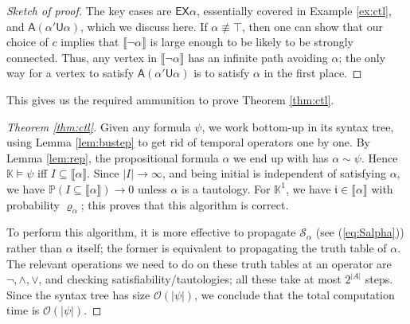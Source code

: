 \documentclass[runngingheads]{llncs}
\newcommand{\ini}{\mathfrak{i}}
\newcommand{\sem}[1]{\llbracket #1 \rrbracket}
\begin{document}
\begin{proof}[Sketch of proof]
The key cases are $\mathsf{EX}\alpha$, essentially covered in Example \ref{ex:ctl}, and $\mathsf{A}(\alpha'\mathsf{U}\alpha)$, which we discuss here. If $\alpha \not \equiv \top$, then one can show that our choice of $c$ implies that $\llbracket \neg \alpha \rrbracket$ is large enough to be likely to be strongly connected. Thus, any vertex in $\llbracket \neg \alpha \rrbracket$ has an infinite path avoiding $\alpha$; the only way for a vertex to satisfy $\mathsf{A}(\alpha'\mathsf{U}\alpha)$ is to satisfy $\alpha$ in the first place.
\end{proof}

This gives us the required ammunition to prove Theorem \ref{thm:ctl}.

\begin{proof}[Theorem \ref{thm:ctl}]
Given any formula $\psi$, we work bottom-up in its syntax tree, using Lemma \ref{lem:bustep} to get rid of temporal operators one by one. By Lemma \ref{lem:rep}, the propositional formula $\alpha$ we end up with has $\alpha \sim \psi$. Hence $\mathbb{K} \models \psi$ iff $I \subseteq \sem{\alpha}$. Since $|I| \rightarrow \infty$, and being initial is independent of satisfying $\alpha$, we have $\mathbb{P}(I \subseteq \sem{\alpha}) \rightarrow 0$ unless $\alpha$ is a tautology. For $\mathbb{K}^1$, we have $\ini \in \sem{\alpha}$ with probability $\varrho_{\alpha}$; this proves that this algorithm is correct.

To perform this algorithm, it is more effective to propagate $\mathcal{S}_{\alpha}$ (see (\ref{eq:Salpha})) rather than $\alpha$ itself; the former is equivalent to propagating the truth table of $\alpha$. The relevant operations we need to do on these truth tables at an operator are $\neg,\wedge,\vee$, and checking satisfiability/tautologies; all these take at most $2^{|A|}$ steps. Since the syntax tree has size $\mathcal{O}(|\psi|)$, we conclude that the total computation time is $\mathcal{O}(|\psi|)$.
\end{proof}
\end{document}
